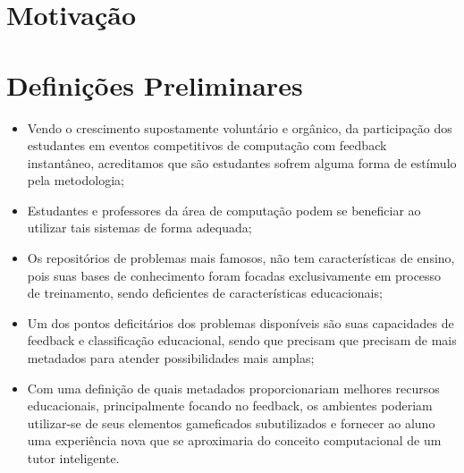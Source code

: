 
 


    
\section{Motivação}

    
\section{Definições Preliminares}


\begin{itemize}
    \item Vendo o crescimento supostamente voluntário e orgânico, da participação dos estudantes em eventos competitivos de computação com feedback instantâneo, acreditamos que são estudantes sofrem alguma forma de estímulo pela metodologia;
    
 
     \item Estudantes e professores da área de computação podem se beneficiar ao utilizar tais sistemas de forma adequada;
 
    \item Os repositórios de problemas mais famosos, não tem características de ensino, pois suas bases de conhecimento foram focadas exclusivamente em processo de treinamento, sendo deficientes de características educacionais;
 
    \item Um dos pontos deficitários dos problemas disponíveis são suas capacidades de feedback e classificação educacional, sendo que precisam que precisam de mais metadados para atender possibilidades mais amplas;

    \item Com uma definição de quais metadados proporcionariam melhores recursos educacionais, principalmente focando no feedback, os ambientes poderiam utilizar-se de seus elementos gameficados subutilizados e fornecer ao aluno uma experiência nova que se aproximaria do conceito computacional de um tutor inteligente.
\end{itemize}

